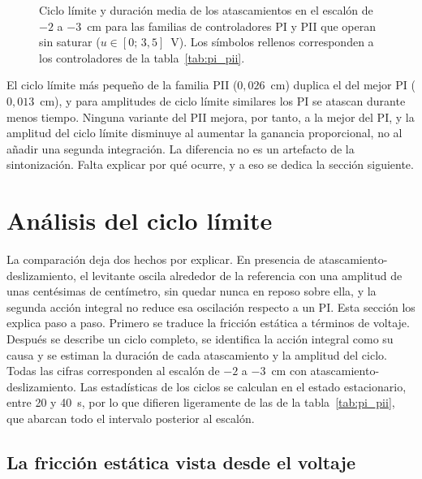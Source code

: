 \begin{figure}[ht]
    \centering
    
    \caption[Familias PI y PII]{Ciclo límite y duración media de los atascamientos en el escalón de $-2$ a $-3$~cm para las familias de controladores PI y PII que operan sin saturar ($u\in[0;\,3{,}5]$~V). Los símbolos rellenos corresponden a los controladores de la tabla~\ref{tab:pi_pii}.}
    \label{fig:r15_familias}
\end{figure}

El ciclo límite más pequeño de la familia PII ($0{,}026$~cm) duplica el del mejor PI ($0{,}013$~cm), y para amplitudes de ciclo límite similares los PI se atascan durante menos tiempo. Ninguna variante del PII mejora, por tanto, a la mejor del PI, y la amplitud del ciclo límite disminuye al aumentar la ganancia proporcional, no al añadir una segunda integración. La diferencia no es un artefacto de la sintonización. Falta explicar por qué ocurre, y a eso se dedica la sección siguiente.

\section{Análisis del ciclo límite}
\label{sec:analisis_ciclo}

La comparación deja dos hechos por explicar. En presencia de atascamiento-deslizamiento, el levitante oscila alrededor de la referencia con una amplitud de unas centésimas de centímetro, sin quedar nunca en reposo sobre ella, y la segunda acción integral no reduce esa oscilación respecto a un PI. Esta sección los explica paso a paso. Primero se traduce la fricción estática a términos de voltaje. Después se describe un ciclo completo, se identifica la acción integral como su causa y se estiman la duración de cada atascamiento y la amplitud del ciclo. Todas las cifras corresponden al escalón de $-2$ a $-3$~cm con atascamiento-deslizamiento. Las estadísticas de los ciclos se calculan en el estado estacionario, entre 20 y 40~s, por lo que difieren ligeramente de las de la tabla~\ref{tab:pi_pii}, que abarcan todo el intervalo posterior al escalón.

\subsection{La fricción estática vista desde el voltaje}

